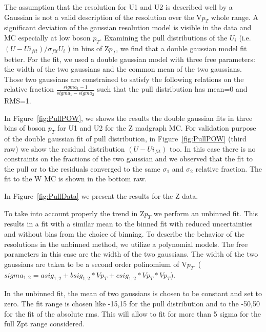 \documentclass[41pt,a4paper,oneside]{report}
\begin{document}
The assumption that the resolution for U1 and U2 is described well by a Gaussian is not a valid description of the resolution over the V$p_{T}$ whole range.
 A significant deviation of the gaussian resolution model is visible in the data and MC especially at low boson $p_{T}$.
Examining the pull distributions of the $U_{i}$ (i.e. $( U-Ui_{fit} )/\sigma_{fit}U_{i}$ ) in bins of Z$p_{T}$,  we find that a double gaussian model fit better.
For the fit, we used a double gaussian model with three free parameters: the width of the two gaussians and the common mean of the two gaussians.
Those two gaussians are constrained to satisfy the following relations on the relative fraction $\frac{sigma_{1}-1}{sigma_{1}-sigma_{2}}$ such that the pull distribution has mean=0 and RMS=1.

In Figure~\ref{fig:PullPOW}, we shows the results the double gaussian fits in three bins of boson $p_{T}$ for U1 and U2 for the Z madgraph MC. 
For validation purpose of the double gaussian fit of pull distribution, in Figure~\ref{fig:PullPOW} (third raw) we show the residual distribution $(U-Ui_{fit})$ too. In this case there is no constraints on the fractions of the two gaussian and we observed that the fit to the pull or to the residuals converged to the same $\sigma_{1}$ and $\sigma_{2}$ relative fraction.
The fit to the W MC is shown in the bottom raw. 

In Figure~\ref{fig:PullData} we present the results for the Z data.

To take into account properly the trend in Z$p_{T}$ we perform an unbinned fit.
This results in a fit with a similar mean to the binned fit with reduced uncertainties and without bias from the choice of binning.
To describe the behavior of the resolutions in the unbinned method, we utilize a polynomial models.
The free parameters in this case are the width of the two gaussians.
The width of the two gaussians are taken to be a second order polinomium of V$p_{T}$.
($sigma_{1,2} = asig_{1,2} + bsig_{1,2}*Vp_{T} + csig_{1,2}*Vp_{T}*Vp_{T}$). 

In the unbinned fit, the mean of two gaussians is chosen to be constant and set to zero.
The fit range is chosen like -15,15 for the pull distribution and to the -50,50 for the fit of the absolute rms. This will allow to fit for more than 5 sigma for the full Zpt range considered.
\end{document}
